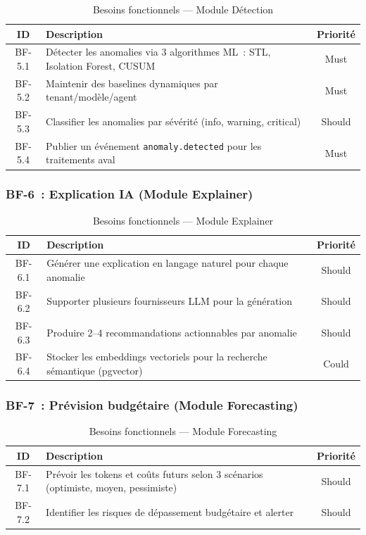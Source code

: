 \begin{table}[H]
\centering
\caption{Besoins fonctionnels --- Module Détection}
\label{tab:bf_detection}
\begin{tabularx}{\textwidth}{|c|X|c|}
\hline
\textbf{ID} & \textbf{Description} & \textbf{Priorité} \\
\hline
BF-5.1 & Détecter les anomalies via 3 algorithmes ML~: STL, Isolation Forest, CUSUM & Must \\
\hline
BF-5.2 & Maintenir des baselines dynamiques par tenant/modèle/agent & Must \\
\hline
BF-5.3 & Classifier les anomalies par sévérité (info, warning, critical) & Should \\
\hline
BF-5.4 & Publier un événement \texttt{anomaly.detected} pour les traitements aval & Must \\
\hline
\end{tabularx}
\end{table}

\subsubsection{BF-6~: Explication IA (Module Explainer)}

\begin{table}[H]
\centering
\caption{Besoins fonctionnels --- Module Explainer}
\label{tab:bf_explainer}
\begin{tabularx}{\textwidth}{|c|X|c|}
\hline
\textbf{ID} & \textbf{Description} & \textbf{Priorité} \\
\hline
BF-6.1 & Générer une explication en langage naturel pour chaque anomalie & Should \\
\hline
BF-6.2 & Supporter plusieurs fournisseurs LLM pour la génération & Should \\
\hline
BF-6.3 & Produire 2--4 recommandations actionnables par anomalie & Should \\
\hline
BF-6.4 & Stocker les embeddings vectoriels pour la recherche sémantique (pgvector) & Could \\
\hline
\end{tabularx}
\end{table}

\subsubsection{BF-7~: Prévision budgétaire (Module Forecasting)}

\begin{table}[H]
\centering
\caption{Besoins fonctionnels --- Module Forecasting}
\label{tab:bf_forecast}
\begin{tabularx}{\textwidth}{|c|X|c|}
\hline
\textbf{ID} & \textbf{Description} & \textbf{Priorité} \\
\hline
BF-7.1 & Prévoir les tokens et coûts futurs selon 3 scénarios (optimiste, moyen, pessimiste) & Should \\
\hline
BF-7.2 & Identifier les risques de dépassement budgétaire et alerter & Should \\
\hline
\end{tabularx}
\end{table}

